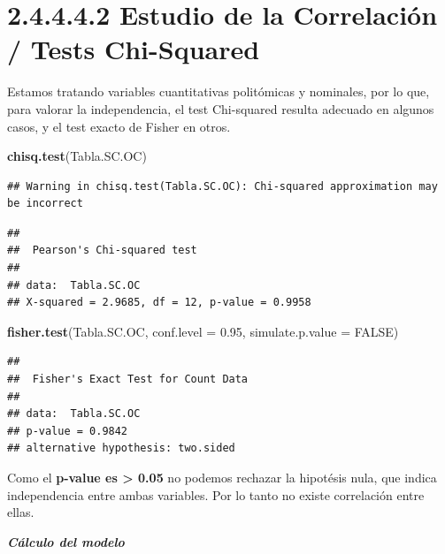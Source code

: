 \documentclass[
]{article}
\newenvironment{Shaded}{\begin{snugshade}}{\end{snugshade}}
\newcommand{\DataTypeTok}[1]{\textcolor[rgb]{0.13,0.29,0.53}{#1}}
\newcommand{\FloatTok}[1]{\textcolor[rgb]{0.00,0.00,0.81}{#1}}
\newcommand{\KeywordTok}[1]{\textcolor[rgb]{0.13,0.29,0.53}{\textbf{#1}}}
\newcommand{\NormalTok}[1]{#1}
\newcommand{\OperatorTok}[1]{\textcolor[rgb]{0.81,0.36,0.00}{\textbf{#1}}}
\newcommand{\OtherTok}[1]{\textcolor[rgb]{0.56,0.35,0.01}{#1}}
\newcommand{\StringTok}[1]{\textcolor[rgb]{0.31,0.60,0.02}{#1}}
\begin{document}
\hypertarget{estudio-de-la-correlaciuxf3n-tests-chi-squared}{%
\section{2.4.4.4.2 Estudio de la Correlación / Tests
Chi-Squared}\label{estudio-de-la-correlaciuxf3n-tests-chi-squared}}

Estamos tratando variables cuantitativas politómicas y nominales, por lo
que, para valorar la independencia, el test Chi-squared resulta adecuado
en algunos casos, y el test exacto de Fisher en otros.

\begin{Shaded}
\begin{Highlighting}[]
\KeywordTok{chisq.test}\NormalTok{(Tabla.SC.OC)}
\end{Highlighting}
\end{Shaded}

\begin{verbatim}
## Warning in chisq.test(Tabla.SC.OC): Chi-squared approximation may be incorrect
\end{verbatim}

\begin{verbatim}
## 
##  Pearson's Chi-squared test
## 
## data:  Tabla.SC.OC
## X-squared = 2.9685, df = 12, p-value = 0.9958
\end{verbatim}

\begin{Shaded}
\begin{Highlighting}[]
\KeywordTok{fisher.test}\NormalTok{(Tabla.SC.OC, }\DataTypeTok{conf.level =} \FloatTok{0.95}\NormalTok{, }\DataTypeTok{simulate.p.value =} \OtherTok{FALSE}\NormalTok{)}
\end{Highlighting}
\end{Shaded}

\begin{verbatim}
## 
##  Fisher's Exact Test for Count Data
## 
## data:  Tabla.SC.OC
## p-value = 0.9842
## alternative hypothesis: two.sided
\end{verbatim}

Como el \textbf{p-value es \textgreater{} 0.05} no podemos rechazar la
hipotésis nula, que indica independencia entre ambas variables. Por lo
tanto no existe correlación entre ellas.

\textbf{\emph{Cálculo del modelo}}

\begin{Shaded}
\end{Shaded}
\end{document}
